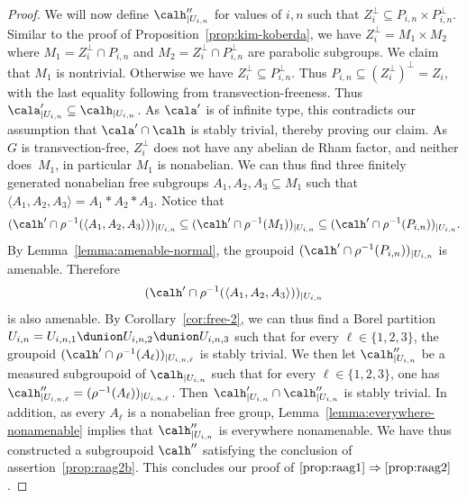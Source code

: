 \begin{proof}
We will now define $\calh''_{|U_{i,n}}$ for values of $i,n$ such that $Z^\perp_i\subseteq P_{i,n}\times P^\perp_{i,n}$. Similar to the proof of Proposition~\ref{prop:kim-koberda}, we have $Z^\perp_i= M_1\times M_2$ where $M_1=Z^\perp_i\cap P_{i,n}$ and $M_2=Z^\perp_i\cap P^\perp_{i,n}$ are parabolic subgroups. We claim that $M_1$ is nontrivial. Otherwise we have $Z^\perp_i\!\subseteq\! P^\perp_{i,n}$. Thus $P_{i,n}\!\subseteq\! (Z^\perp_i)^\perp=Z_i$, with the last equality following from transvection-freeness. Thus $\cala'_{|U_{i,n}}\subseteq \calh_{|U_{i,n}}$. As $\cala'$ is of infinite type, this contradicts our assumption that $\cala'\cap \calh$ is stably trivial, thereby proving our claim. As~$G$ is transvection-free, $Z^\perp_i$ does not have any abelian de Rham factor, and neither does~$M_1$, in particular $M_1$ is nonabelian. We can thus find three finitely generated nonabelian free subgroups $A_1,A_2,A_3\subseteq M_1$ such that $\langle A_1,A_2,A_3\rangle=A_1\ast A_2\ast A_3$. Notice that
\[
(\calh'\cap\rho^{-1}(\langle A_1,A_2,A_3\rangle))_{|U_{i,n}}\subseteq (\calh'\cap\rho^{-1}(M_1))_{|U_{i,n}}\subseteq (\calh'\cap\rho^{-1}(P_{i,n}))_{|U_{i,n}}.
\]
By Lemma~\ref{lemma:amenable-normal}, the groupoid $(\calh'\cap \rho^{-1}(P_{i,n}))_{|U_{i,n}}$ is amenable. Therefore
\[
(\calh'\cap\rho^{-1}(\langle A_1,A_2,A_3\rangle))_{|U_{i,n}}
\]
is also amenable. By Corollary~\ref{cor:free-2}, we can thus find a Borel partition $U_{i,n}=U_{i,n,1}\dunion U_{i,n,2}\dunion U_{i,n,3}$ such that for every $\ell\in\{1,2,3\}$, the groupoid $(\calh'\cap\rho^{-1}(A_\ell))_{|U_{i,n,\ell}}$ is stably trivial. We then let $\calh''_{|U_{i,n}}$ be a measured subgroupoid of $\calh_{|U_{i,n}}$ such that for every $\ell\in\{1,2,3\}$, one has $\calh''_{|U_{i,n,\ell}}=(\rho^{-1}(A_\ell))_{|U_{i,n,\ell}}$. Then $\calh'_{|U_{i,n}}\cap\calh''_{|U_{i,n}}$ is stably trivial. In addition, as every $A_\ell$ is a nonabelian free group, Lemma~\ref{lemma:everywhere-nonamenable} implies that $\calh''_{|U_{i,n}}$ is everywhere nonamenable. We have thus constructed a subgroupoid $\calh''$ satisfying the conclusion of assertion~\eqref{prop:raag2b}. This concludes our proof of $\eqref{prop:raag1}\Rightarrow\eqref{prop:raag2}$.


\end{proof}
